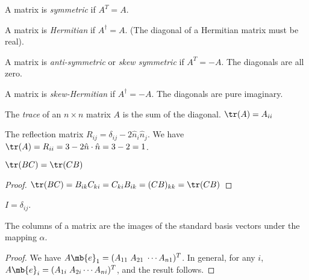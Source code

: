 \documentclass[a4paper]{article}
\begin{document}
\begin{defi}
  A matrix is \emph{symmetric} if $A^T = A$.
\end{defi}

\begin{defi}
 A matrix is \emph{Hermitian} if $A^\dagger = A$. (The diagonal of a Hermitian matrix must be real).
\end{defi}

\begin{defi}
  A matrix is \emph{anti-symmetric} or \emph{skew symmetric} if $A^T = -A$. The diagonals are all zero.
\end{defi}

\begin{defi}
  A matrix is \emph{skew-Hermitian} if $A^\dagger = -A$. The diagonals are pure imaginary.
\end{defi}

\begin{defi}
  The \emph{trace} of an $n\times n$ matrix $A$ is the sum of the diagonal. $\tr(A) = A_{ii}$
\end{defi}

\begin{eg}
  The reflection matrix $R_{ij} = \delta_{ij} - 2\hat n_i \hat n_j$. We have $\tr(A) = R_{ii} = 3 - 2\hat{n}\cdot \hat{n} = 3 - 2 = 1$.
\end{eg}

\begin{prop}
  $\tr(BC) = \tr(CB)$
\end{prop}

\begin{proof}
  $\tr(BC) = B_{ik}C_{ki} = C_{ki}B_{ik} = (CB)_{kk} = \tr(CB)$
\end{proof}

\begin{defi}
  $I = \delta_{ij}$.
\end{defi}

\begin{prop}
  The columns of a matrix are the images of the standard basis vectors under the mapping $\alpha$.
\end{prop}

\begin{proof}
  We have $A\mb{e}_1 = (A_{11}\; A_{21}\; \cdots A_{n1})^T$. In general, for any $i$, $A\mb{e}_i = (A_{1i}\; A_{2i}\cdots A_{ni})^T$, and the result follows.
\end{proof}
\end{document}
